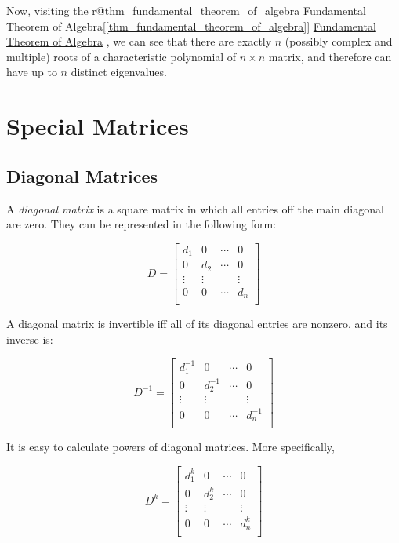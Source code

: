 \documentclass{report}
\begin{document}
		Now, visiting the
		\ifcsname r@thm_fundamental_theorem_of_algebra \endcsname
		Fundamental Theorem of Algebra[\ref{thm_fundamental_theorem_of_algebra}]%
		\else
		\href{https://en.wikipedia.org/wiki/Fundamental_theorem_of_algebra}{Fundamental Theorem of Algebra}
		\fi
		, we can see that there are exactly $n$ (possibly complex and multiple) roots of a characteristic polynomial of $n \times n$ matrix, and therefore can have up to $n$ distinct eigenvalues.
	
	\section{Special Matrices}
		\subsection{Diagonal Matrices}
		A \emph{diagonal matrix} is a square matrix in which all entries off the main diagonal are zero. They can be represented in the following form:
		
		\begin{displaymath}
		D=
		\begin{bmatrix}
		d_1 & 0 & \cdots & 0 \\
		0 & d_2 & \cdots & 0 \\
		\vdots & \vdots &        & \vdots \\
		0 & 0 & \cdots & d_n \\
		\end{bmatrix}
		\end{displaymath}
		
		A diagonal matrix is invertible iff all of its diagonal entries are nonzero, and its inverse is:
		
		\begin{displaymath}
		D^{-1}=
		\begin{bmatrix}
		d_1^{-1} & 0 & \cdots & 0 \\
		0 & d_2^{-1} & \cdots & 0 \\
		\vdots & \vdots &        & \vdots \\
		0 & 0 & \cdots & d_n^{-1} \\
		\end{bmatrix}
		\end{displaymath}
		
		It is easy to calculate powers of diagonal matrices. More specifically,
		
		\begin{displaymath}
		D^{k}=
		\begin{bmatrix}
		d_1^{k} & 0 & \cdots & 0 \\
		0 & d_2^{k} & \cdots & 0 \\
		\vdots & \vdots &        & \vdots \\
		0 & 0 & \cdots & d_n^{k} \\
		\end{bmatrix}
		\end{displaymath}
		
\end{document}
